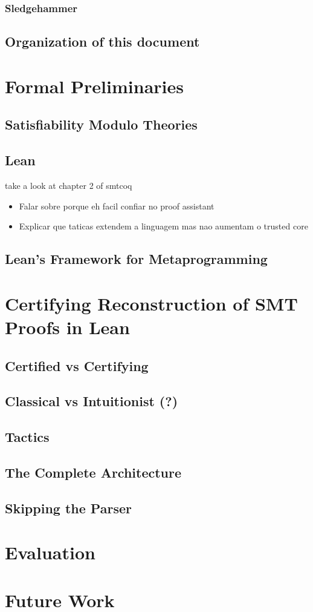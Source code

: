 \documentclass[
	msc,
	english
]{ppgccufmg}
\begin{document}
		\subsection{Sledgehammer}
           \label{sec:sledgehammer}
			
	  \section{Organization of this document}
	    
	\chapter{Formal Preliminaries}
	  \section{Satisfiability Modulo Theories}
	    
	  \section{Lean}
	    take a look at chapter 2 of smtcoq
	    \begin{itemize}
	      \item Falar sobre porque eh facil confiar no proof assistant
		  \item Explicar que taticas extendem a linguagem mas nao aumentam o trusted core
	    \end{itemize}
	  \section{Lean's Framework for Metaprogramming}
	\chapter{Certifying Reconstruction of SMT Proofs in Lean}
	  \section{Certified vs Certifying}
      \label{sec:certifiedVsCertifying}
	  \section{Classical vs Intuitionist (?)}
	  \section{Tactics}
	  \section{The Complete Architecture}
	  \section{Skipping the Parser}
	\chapter{Evaluation}
	\chapter{Future Work}

		
		
\end{document}
